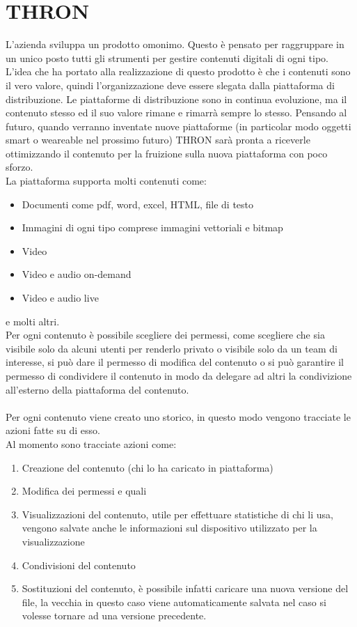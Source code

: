 \documentclass[a4paper, 12pt, twoside, openright]{book}
\begin{document}
\newpage{}
\section{THRON}
L'azienda sviluppa un prodotto omonimo. Questo è pensato per raggruppare in un unico posto tutti gli strumenti per gestire contenuti digitali di ogni tipo.\\
L'idea che ha portato alla realizzazione di questo prodotto è che i contenuti sono il vero valore, quindi l'organizzazione deve essere slegata dalla piattaforma di distribuzione. Le piattaforme di distribuzione sono in continua evoluzione, ma il contenuto stesso ed il suo valore rimane e rimarrà sempre lo stesso. Pensando al futuro, quando verranno inventate nuove piattaforme (in particolar modo oggetti smart o weareable nel prossimo futuro) THRON sarà pronta a riceverle ottimizzando il contenuto per la fruizione sulla nuova piattaforma con poco sforzo.\\
La piattaforma supporta molti contenuti come:
\begin{itemize}
\item Documenti come pdf, word, excel, HTML, file di testo
\item Immagini di ogni tipo comprese immagini vettoriali e bitmap
\item Video
\item Video e audio on-demand
\item Video e audio live
\end{itemize}
e molti altri.\\
Per ogni contenuto è possibile scegliere dei permessi, come scegliere che sia visibile solo da alcuni utenti per renderlo privato o visibile solo da un team di interesse, si può dare il permesso di modifica del contenuto o si può garantire il permesso di condividere il contenuto in modo da delegare ad altri la condivizione all'esterno della piattaforma del contenuto.\\ \\
Per ogni contenuto viene creato uno storico, in questo modo vengono tracciate le azioni fatte su di esso.\\
Al momento sono tracciate azioni come:
\begin{enumerate}
\item Creazione del contenuto (chi lo ha caricato in piattaforma)
\item Modifica dei permessi e quali
\item Visualizzazioni del contenuto, utile per effettuare statistiche di chi li usa, vengono salvate anche le informazioni sul dispositivo utilizzato per la visualizzazione
\item Condivisioni del contenuto
\item Sostituzioni del contenuto, è possibile infatti caricare una nuova versione del file, la vecchia in questo caso viene automaticamente salvata nel caso si volesse tornare ad una versione precedente.
\end{enumerate}
\end{document}
